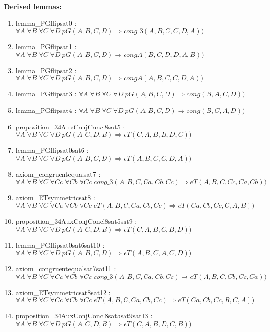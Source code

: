 \documentclass{article}
\begin{document}
\hrulefill

\noindent 
{\bfseries Derived lemmas:} 
\begin{enumerate}
\item lemma\_PGflipsat0 : $\forall A\;\forall B\;\forall C\;\forall D\;pG(A, B, C, D) \Rightarrow cong\_3(A, B, C, C, D, A))$
\item lemma\_PGflipsat1 : $\forall A\;\forall B\;\forall C\;\forall D\;pG(A, B, C, D) \Rightarrow congA(B, C, D, D, A, B))$
\item lemma\_PGflipsat2 : $\forall A\;\forall B\;\forall C\;\forall D\;pG(A, B, C, D) \Rightarrow congA(A, B, C, C, D, A))$
\item lemma\_PGflipsat3 : $\forall A\;\forall B\;\forall C\;\forall D\;pG(A, B, C, D) \Rightarrow cong(B, A, C, D))$
\item lemma\_PGflipsat4 : $\forall A\;\forall B\;\forall C\;\forall D\;pG(A, B, C, D) \Rightarrow cong(B, C, A, D))$
\item proposition\_34AuxConjConcl8sat5 : $\forall A\;\forall B\;\forall C\;\forall D\;pG(A, C, D, B) \Rightarrow eT(C, A, B, B, D, C))$
\item lemma\_PGflipsat0sat6 : $\forall A\;\forall B\;\forall C\;\forall D\;pG(A, B, C, D) \Rightarrow eT(A, B, C, C, D, A))$
\item axiom\_congruentequalsat7 : $\forall A\;\forall B\;\forall C\;\forall Ca\;\forall Cb\;\forall Cc\;cong\_3(A, B, C, Ca, Cb, Cc) \Rightarrow eT(A, B, C, Cc, Ca, Cb))$
\item axiom\_ETsymmetricsat8 : $\forall A\;\forall B\;\forall C\;\forall Ca\;\forall Cb\;\forall Cc\;eT(A, B, C, Ca, Cb, Cc) \Rightarrow eT(Ca, Cb, Cc, C, A, B))$
\item proposition\_34AuxConjConcl8sat5sat9 : $\forall A\;\forall B\;\forall C\;\forall D\;pG(A, C, D, B) \Rightarrow eT(C, A, B, C, B, D))$
\item lemma\_PGflipsat0sat6sat10 : $\forall A\;\forall B\;\forall C\;\forall D\;pG(A, B, C, D) \Rightarrow eT(A, B, C, A, C, D))$
\item axiom\_congruentequalsat7sat11 : $\forall A\;\forall B\;\forall C\;\forall Ca\;\forall Cb\;\forall Cc\;cong\_3(A, B, C, Ca, Cb, Cc) \Rightarrow eT(A, B, C, Cb, Cc, Ca))$
\item axiom\_ETsymmetricsat8sat12 : $\forall A\;\forall B\;\forall C\;\forall Ca\;\forall Cb\;\forall Cc\;eT(A, B, C, Ca, Cb, Cc) \Rightarrow eT(Ca, Cb, Cc, B, C, A))$
\item proposition\_34AuxConjConcl8sat5sat9sat13 : $\forall A\;\forall B\;\forall C\;\forall D\;pG(A, C, D, B) \Rightarrow eT(C, A, B, D, C, B))$

\end{enumerate}
\end{document}
